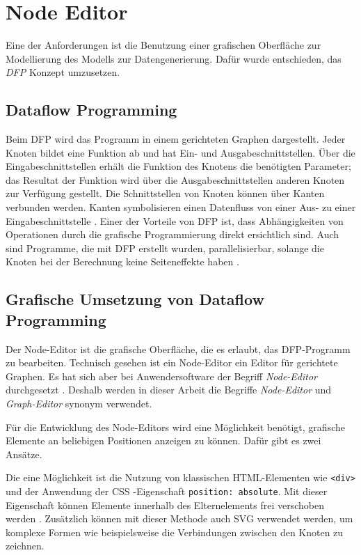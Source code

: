 \section{Node Editor}

Eine der Anforderungen ist die Benutzung einer grafischen Oberfläche zur Modellierung des Modells zur Datengenerierung. Dafür wurde entschieden, das \textit{\ac{DFP}} Konzept umzusetzen.

\subsection{Dataflow Programming}

Beim \ac{DFP} wird das Programm in einem gerichteten Graphen dargestellt. Jeder Knoten bildet eine Funktion ab und hat Ein- und Ausgabeschnittstellen. Über die Eingabeschnittstellen erhält die Funktion des Knotens die benötigten Parameter; das Resultat der Funktion wird über die Ausgabeschnittstellen anderen Knoten zur Verfügung gestellt. Die Schnittstellen von Knoten können über Kanten verbunden werden. Kanten symbolisieren einen Datenfluss von einer Aus- zu einer Eingabeschnittstelle \cite{dataflow}. Einer der Vorteile von \ac{DFP} ist, dass Abhängigkeiten von Operationen durch die grafische Programmierung direkt ersichtlich sind. Auch sind Programme, die mit \ac{DFP} erstellt wurden, parallelisierbar, solange die Knoten bei der Berechnung keine Seiteneffekte haben \cite{dataflow}.

\subsection{Grafische Umsetzung von Dataflow Programming}

Der Node-Editor ist die grafische Oberfläche, die es erlaubt, das \ac{DFP}-Programm zu bearbeiten. Technisch gesehen ist ein Node-Editor ein Editor für gerichtete Graphen. Es hat sich aber bei Anwendersoftware der Begriff \textit{Node-Editor} durchgesetzt \cite{nodeeditor:blender, nodeeditor:maya}. Deshalb werden in dieser Arbeit die Begriffe \textit{Node-Editor} und \textit{Graph-Editor} synonym verwendet.

Für die Entwicklung des Node-Editors wird eine Möglichkeit benötigt, grafische Elemente an beliebigen Positionen anzeigen zu können. Dafür gibt es zwei Ansätze.

Die eine Möglichkeit ist die Nutzung von klassischen \ac{HTML}-Elementen wie \texttt{<div>} und der Anwendung der \ac{CSS}
-Eigenschaft \texttt{position: absolute}. Mit dieser Eigenschaft können Elemente innerhalb des Elternelements frei verschoben werden \cite{mdn:position}. Zusätzlich können mit dieser Methode auch \ac{SVG} verwendet werden, um komplexe Formen wie beispielsweise die Verbindungen zwischen den Knoten zu zeichnen.


